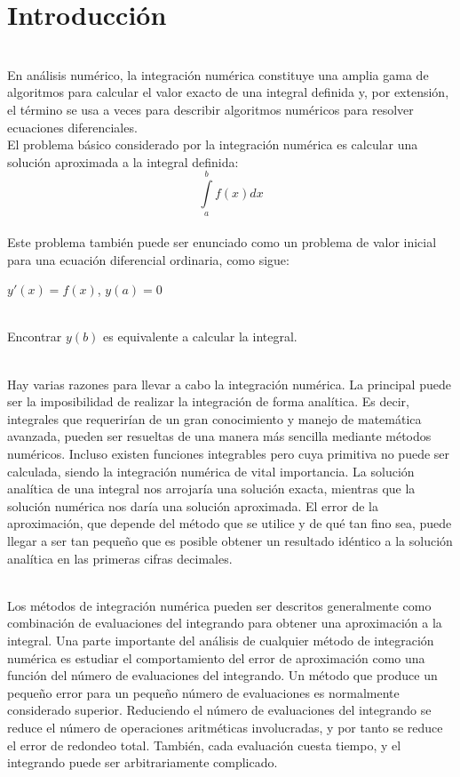\documentclass[report,oneside]{revcoles}
\begin{document}
\section{Introducción}
~\\En análisis numérico, la integración numérica constituye una amplia gama de algoritmos para calcular el valor exacto de una integral definida y, por extensión, el término se usa a veces para describir algoritmos numéricos para resolver ecuaciones diferenciales.
~\\El problema básico considerado por la integración numérica es calcular una solución aproximada a la integral definida:
$$\int\limits^{b}_{a}f(x)dx$$
~\\Este problema también puede ser enunciado como un problema de valor inicial para una ecuación diferencial ordinaria, como sigue:
\begin{center}
$y'(x)=f(x)$,  $y(a)=0$
\end{center}
~\\Encontrar $y(b)$ es equivalente a calcular la integral.

~\\Hay varias razones para llevar a cabo la integración numérica. La principal puede ser la imposibilidad de realizar la integración de forma analítica. Es decir, integrales que requerirían de un gran conocimiento y manejo de matemática avanzada, pueden ser resueltas de una manera más sencilla mediante métodos numéricos. Incluso existen funciones integrables pero cuya primitiva no puede ser calculada, siendo la integración numérica de vital importancia. La solución analítica de una integral nos arrojaría una solución exacta, mientras que la solución numérica nos daría una solución aproximada. El error de la aproximación, que depende del método que se utilice y de qué tan fino sea, puede llegar a ser tan pequeño que es posible obtener un resultado idéntico a la solución analítica en las primeras cifras decimales.

~\\Los métodos de integración numérica pueden ser descritos generalmente como combinación de evaluaciones del integrando para obtener una aproximación a la integral. Una parte importante del análisis de cualquier método de integración numérica es estudiar el comportamiento del error de aproximación como una función del número de evaluaciones del integrando. Un método que produce un pequeño error para un pequeño número de evaluaciones es normalmente considerado superior. Reduciendo el número de evaluaciones del integrando se reduce el número de operaciones aritméticas involucradas, y por tanto se reduce el error de redondeo total. También, cada evaluación cuesta tiempo, y el integrando puede ser arbitrariamente complicado.
\end{document}
